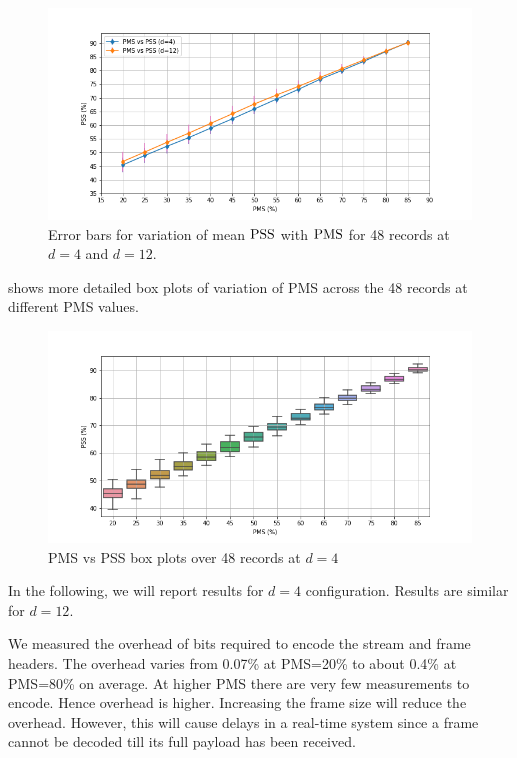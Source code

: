 \begin{figure}
\centering
\includegraphics[width=0.95\linewidth]{images/bsbl/pms-vs-pss-errorbar.png}
\caption{Error bars for variation of mean $\mathrm{PSS}$
with $\mathrm{PMS}$ for 48 records at $d=4$ and $d=12$.}
\label{fig-res-pms-pss-errorbar}
\end{figure}

 shows more detailed box plots
of variation of PMS across the 48 records at different PMS values.

\begin{figure}
\centering
\includegraphics[width=0.95\linewidth]{images/bsbl/pms-vs-pss-boxplot-d4.png}
\caption{PMS vs PSS box plots over 48 records at $d=4$}
\label{fig-res-pms-pss-boxplot-d4}
\end{figure}
In the following, we will report results for $d=4$
configuration. Results are similar for $d=12$.

We measured the overhead of bits required to
encode the stream and frame headers. The overhead
varies from 0.07\% at PMS=20\% to about 0.4\% at PMS=80\%
on average. At higher PMS there are very few measurements
to encode. Hence overhead is higher. Increasing the frame
size will reduce the overhead. However, this will cause
delays in a real-time system since a frame cannot be decoded
till its full payload has been received. 

